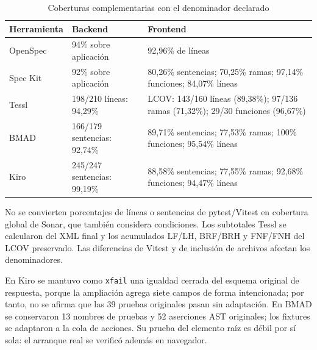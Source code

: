 \begin{table}[H]\centering\small\setlength{\tabcolsep}{4pt}\renewcommand{\arraystretch}{1.06}
\caption{Coberturas complementarias con el denominador declarado}
\label{tab:coberturas_tests_tetris_e2}
\begin{tabularx}{\textwidth}{l Y Y}\toprule

\textbf{Herramienta} & \textbf{Backend} & \textbf{Frontend} \\ \midrule

OpenSpec & 94\% sobre aplicación & 92,96\% de líneas \\

Spec Kit & 92\% sobre aplicación & 80,26\% sentencias; 70,25\% ramas; 97,14\% funciones; 84,07\% líneas \\

Tessl & 198/210 líneas: 94,29\% & LCOV: 143/160 líneas (89,38\%); 97/136 ramas (71,32\%); 29/30 funciones (96,67\%) \\

BMAD & 166/179 sentencias: 92,74\% & 89,71\% sentencias; 77,53\% ramas; 100\% funciones; 95,54\% líneas \\

Kiro & 245/247 sentencias: 99,19\% & 88,58\% sentencias; 77,55\% ramas; 92,68\% funciones; 94,47\% líneas \\

\bottomrule\end{tabularx}

\par\smallskip\begin{minipage}{\textwidth}\footnotesize No se convierten porcentajes de líneas o sentencias de pytest/Vitest en cobertura global de Sonar, que también considera condiciones. Los subtotales Tessl se calcularon del XML final y los acumulados LF/LH, BRF/BRH y FNF/FNH del LCOV preservado. Las diferencias de Vitest y de inclusión de archivos afectan los denominadores.\end{minipage}

\end{table}

En Kiro se mantuvo como \texttt{xfail} una igualdad cerrada del esquema original de respuesta, porque la ampliación agrega siete campos de forma intencionada; por tanto, no se afirma que las 39 pruebas originales pasan sin adaptación. En BMAD se conservaron 13 nombres de pruebas y 52 aserciones AST originales; los fixtures se adaptaron a la cola de acciones. Su prueba del elemento raíz es débil por sí sola: el arranque real se verificó además en navegador.

